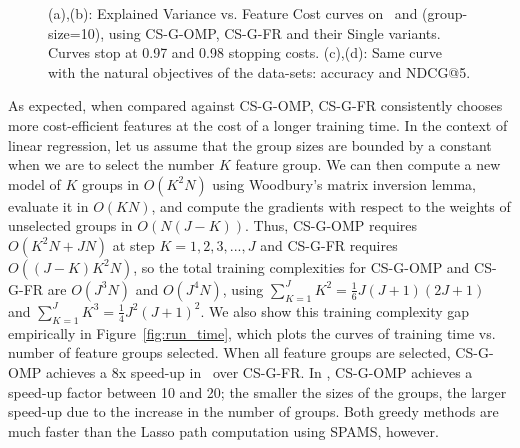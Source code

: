 

\begin{figure}
\centering
{}




\caption{(a),(b): Explained Variance vs. Feature Cost curves on 
\Grain\, and \YahooLTR (group-size=10), 
using CS-G-OMP, CS-G-FR and their Single variants. Curves stop at 0.97 and 0.98 stopping costs. (c),(d): Same curve with the natural objectives of the data-sets: accuracy and NDCG@5.} 
\label{fig:selection_methods}
\end{figure}

As expected, when compared against CS-G-OMP, CS-G-FR consistently chooses more cost-efficient features at the cost of a longer training time.
In the context of linear regression, let us assume that the group sizes are 
bounded by a constant when we are to select the number 
$K$ feature group. We can then compute a new model of $K$  groups in $O(K^2N)$ using
Woodbury's matrix inversion lemma, evaluate it in $O(KN)$, and compute the gradients with respect to the weights of unselected groups in $O(N(J-K))$. Thus, CS-G-OMP requires $O(K^2N + JN)$ at step $K=1,2,3,..., J$ and CS-G-FR requires $O((J-K)K^2N)$, so the total training  complexities for CS-G-OMP and CS-G-FR are $O(J^3N)$ and $O(J^4N)$, using $\sum_{K=1}^J K^2 = \frac{1}{6}J(J+1)(2J+1)$ and $\sum _{K=1}^J K^3 = \frac{1}{4}J^2(J+1)^2$. 
We also show this training complexity gap empirically in Figure~\ref{fig:run_time}, which plots the curves of training time vs. number of feature groups selected. When all feature groups are selected, CS-G-OMP achieves a 8x speed-up in \Grain\ over CS-G-FR. In \YahooLTR, CS-G-OMP achieves a speed-up factor between 10 and 20; the smaller the sizes of the groups, the larger speed-up due to the increase in the number of groups. Both greedy methods are much faster than the Lasso path computation using SPAMS, however. 


